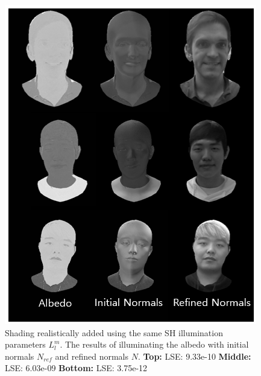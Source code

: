 \documentclass[10pt,twocolumn,letterpaper]{article}
\begin{document}
\begin{figure}[!h]
    \begin{center}
        \includegraphics [scale=0.75] {image/grey-sh.png}
    \end{center}
    \caption{Shading realistically added using the same SH illumination parameters $L_l^m$. The results of illuminating the albedo with initial normals $N_{ref}$ and refined normals $N$. \textbf{Top:} LSE: 9.33e-10 \textbf{Middle:} LSE: 6.03e-09 \textbf{Bottom:} LSE: 3.75e-12}
    \label{fig:grey}
\end{figure} 
\end{document}

